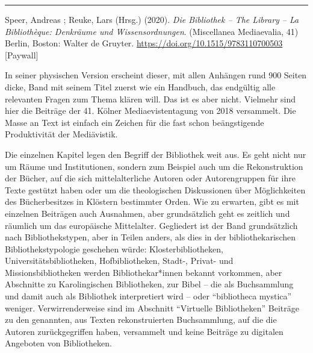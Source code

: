 \documentclass[a4paper,
fontsize=11pt,
oneside,
numbers=noperiodatend,
parskip=half-,
bibliography=totoc,
final
]{scrartcl}
\begin{document}
\begin{center}\rule{0.5\linewidth}{0.5pt}\end{center}

Speer, Andreas ; Reuke, Lars (Hrsg.) (2020). \emph{Die Bibliothek -- The
Library -- La Bibliothèque: Denkräume und Wissensordnungen}.
(Miscellanea Mediaevalia, 41) Berlin, Boston: Walter de Gruyter.
\url{https://doi.org/10.1515/9783110700503} {[}Paywall{]}

In seiner physischen Version erscheint dieser, mit allen Anhängen rund
900 Seiten dicke, Band mit seinem Titel zuerst wie ein Handbuch, das
endgültig alle relevanten Fragen zum Thema klären will. Das ist es aber
nicht. Vielmehr sind hier die Beiträge der 41. Kölner Mediaevistentagung
von 2018 versammelt. Die Masse an Text ist einfach ein Zeichen für die
fast schon beängstigende Produktivität der Mediävistik.

Die einzelnen Kapitel legen den Begriff der Bibliothek weit aus. Es geht
nicht nur um Räume und Institutionen, sondern zum Beispiel auch um die
Rekonstruktion der Bücher, auf die sich mittelalterliche Autoren oder
Autorengruppen für ihre Texte gestützt haben oder um die theologischen
Diskussionen über Möglichkeiten des Bücherbesitzes in Klöstern
bestimmter Orden. Wie zu erwarten, gibt es mit einzelnen Beiträgen auch
Ausnahmen, aber grundsätzlich geht es zeitlich und räumlich um das
europäische Mittelalter. Gegliedert ist der Band grundsätzlich nach
Bibliothekstypen, aber in Teilen anders, als dies in der
bibliothekarischen Bibliothekstypologie geschehen würde:
Klosterbibliotheken, Universitätsbibliotheken, Hofbibliotheken, Stadt-,
Privat- und Missionsbibliotheken werden Bibliothekar*innen bekannt
vorkommen, aber Abschnitte zu Karolingischen Bibliotheken, zur Bibel --
die als Buchsammlung und damit auch als Bibliothek interpretiert wird --
oder \enquote{bibliotheca mystica} weniger. Verwirrenderweise sind im
Abschnitt \enquote{Virtuelle Bibliotheken} Beiträge zu den genannten,
aus Texten rekonstruierten Buchsammlung, auf die die Autoren
zurückgegriffen haben, versammelt und keine Beiträge zu digitalen
Angeboten von Bibliotheken.
\end{document}
